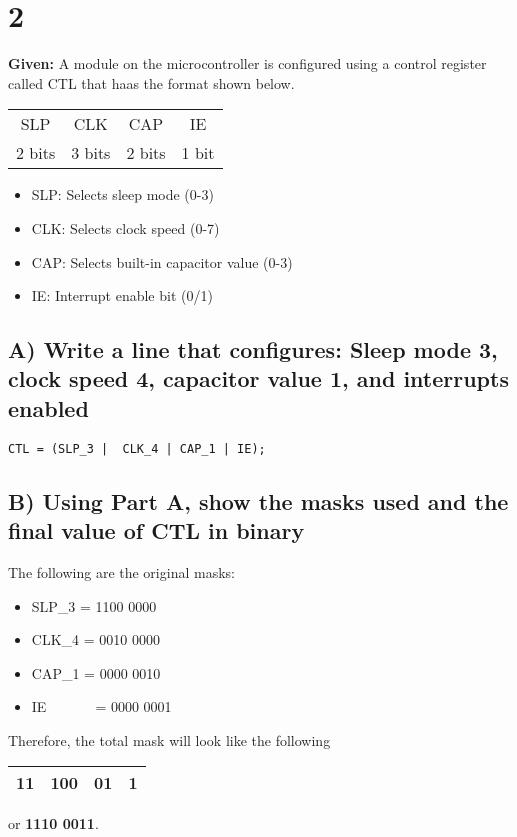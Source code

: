 \documentclass{article}
\begin{document}
\section{2}
\textbf{Given: } A module on the microcontroller is configured using a control register called CTL that haas the format shown below.
\begin{table}[h!]
    \centering
    \begin{tabular}{|c|c|c|c|}
        \hline
        SLP & CLK & CAP & IE \\
        2 bits & 3 bits & 2 bits & 1 bit \\
        \hline
    \end{tabular}
\end{table}
\begin{itemize}
	\item SLP: Selects sleep mode (0-3)
	\item CLK: Selects clock speed (0-7)
	\item CAP: Selects built-in capacitor value (0-3)
	\item IE: Interrupt enable bit (0/1)
\end{itemize}

\subsection{A) Write a line that configures: Sleep mode 3, clock speed 4, capacitor value 1, and interrupts enabled}
\begin{lstlisting}
CTL = (SLP_3 |  CLK_4 | CAP_1 | IE);
\end{lstlisting}

\subsection{B) Using Part A, show the masks used and the final value of CTL in binary}
The following are the original masks:
\begin{itemize}
	\item SLP\_3 = 1100 0000
	\item CLK\_4 = 0010 0000
	\item CAP\_1 = 0000 0010
	\item IE\ \ \ \ \ \ \ = 0000 0001
\end{itemize}
Therefore, the total mask will look like the following
\begin{table}[h!]
    \centering
    \begin{tabular}{|c|c|c|c|}
        \hline
				11 & 100 & 01 & 1\\
        \hline
    \end{tabular}
\end{table}
\newline
or \textbf{1110 0011}.
\end{document}
